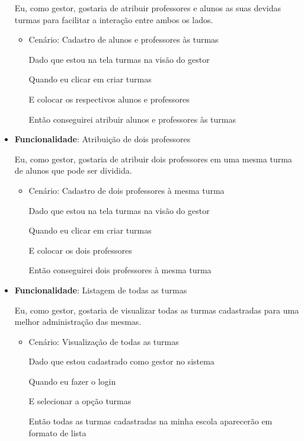 \begin{itemize}
    Eu, como gestor, gostaria de atribuir professores e alunos as suas devidas turmas para facilitar a interação entre ambos os lados.
    \begin{itemize}
        \item Cenário: Cadastro de alunos e professores às turmas
        \par Dado que estou na tela turmas na visão do gestor
        \par Quando eu clicar em criar turmas
        \par E colocar os respectivos alunos e professores
        \par Então conseguirei atribuir alunos e professores às turmas
    \end{itemize}

\item\textbf{Funcionalidade}: Atribuição de dois professores 
    
    Eu, como gestor, gostaria de atribuir dois professores em uma mesma turma de alunos que pode ser dividida.
    \begin{itemize}
        \item Cenário: Cadastro de dois professores à mesma turma
        \par Dado que estou na tela turmas na visão do gestor
        \par Quando eu clicar em criar turmas
        \par E colocar os dois professores
        \par Então conseguirei dois professores à mesma turma
    \end{itemize}

\item\textbf{Funcionalidade}: Listagem de todas as turmas
    
    Eu, como gestor, gostaria de visualizar todas as turmas cadastradas para uma melhor administração das mesmas.
    \begin{itemize}
        \item Cenário: Visualização de todas as turmas 
        \par Dado que estou cadastrado como gestor no sistema
        \par Quando eu fazer o login
        \par E selecionar a opção turmas
        \par Então todas as turmas cadastradas na minha escola aparecerão em formato de lista
    \end{itemize}  


\end{itemize}
